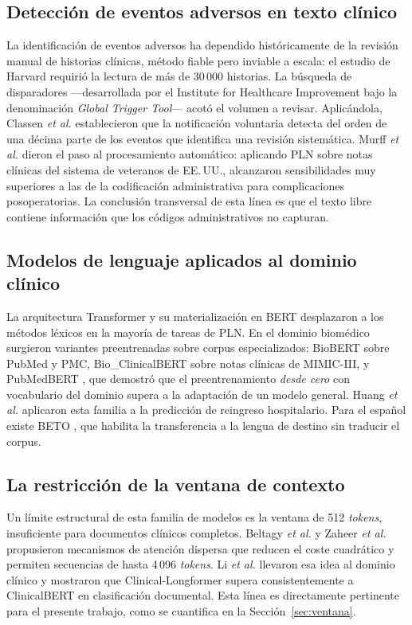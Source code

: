 \documentclass[conference]{IEEEtran}
\begin{document}
\subsection{Detección de eventos adversos en texto clínico}
La identificación de eventos adversos ha dependido históricamente de la
revisión manual de historias clínicas, método fiable pero inviable a escala:
el estudio de Harvard \cite{brennan} requirió la lectura de más de 30\,000
historias. La búsqueda de disparadores ---desarrollada por el Institute for
Healthcare Improvement bajo la denominación \emph{Global Trigger Tool}---
acotó el volumen a revisar. Aplicándola, Classen \emph{et al.}
\cite{classen} establecieron que la notificación voluntaria detecta del orden
de una décima parte de los eventos que identifica una revisión sistemática. Murff \emph{et al.} \cite{murff} dieron el paso al procesamiento
automático: aplicando PLN sobre notas clínicas del sistema de veteranos de
EE.\,UU., alcanzaron sensibilidades muy superiores a las de la codificación
administrativa para complicaciones posoperatorias. La conclusión transversal de
esta línea es que el texto libre contiene información que los códigos
administrativos no capturan.

\subsection{Modelos de lenguaje aplicados al dominio clínico}
La arquitectura Transformer \cite{vaswani} y su materialización en BERT
\cite{bert} desplazaron a los métodos léxicos en la mayoría de tareas de PLN.
En el dominio biomédico surgieron variantes preentrenadas sobre corpus
especializados: BioBERT \cite{biobert} sobre PubMed y PMC, Bio\_ClinicalBERT
\cite{clinicalbert} sobre notas clínicas de MIMIC-III, y PubMedBERT
\cite{pubmedbert}, que demostró que el preentrenamiento \emph{desde cero} con
vocabulario del dominio supera a la adaptación de un modelo general. Huang
\emph{et al.} \cite{huang} aplicaron esta familia a la predicción de
reingreso hospitalario. Para el español existe BETO \cite{beto}, que habilita
la transferencia a la lengua de destino sin traducir el corpus.

\subsection{La restricción de la ventana de contexto}
Un límite estructural de esta familia de modelos es la ventana de 512
\emph{tokens}, insuficiente para documentos clínicos completos. Beltagy
\emph{et al.} \cite{longformer} y Zaheer \emph{et al.} \cite{bigbird}
propusieron mecanismos de atención dispersa que reducen el coste cuadrático y
permiten secuencias de hasta 4\,096 \emph{tokens}. Li \emph{et al.}
\cite{cliniclong} llevaron esa idea al dominio clínico y mostraron que
Clinical-Longformer supera consistentemente a ClinicalBERT en clasificación
documental. Esta línea es directamente pertinente para el presente trabajo,
como se cuantifica en la Sección~\ref{sec:ventana}.
\end{document}

